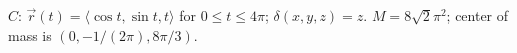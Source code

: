 {$C$: $\vec r(t) = \langle \cos t,\sin t, t\rangle$ for $0\leq t\leq 4\pi$; $\delta(x,y,z) = z$. 
}
{$M=8\sqrt{2}\pi^2$; center of mass is $(0,-1/(2\pi), 8\pi/3)$.
}

